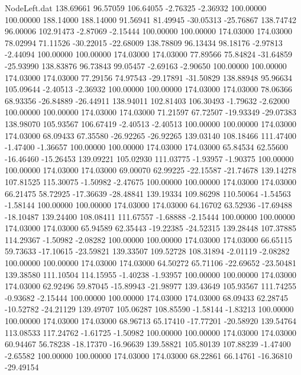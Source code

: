 \begin{filecontents}{NodeLeft.dat}
 138.69661   96.57059  106.64055    -2.76325   -2.36932  100.00000  100.00000  188.14000  188.14000   91.56941   81.49945  -30.05313  -25.76867
 138.74742   96.00006  102.91473    -2.87069   -2.15444  100.00000  100.00000  174.03000  174.03000   78.02994   71.11526  -30.22015  -22.68009
 138.78809   96.13434   98.18176    -2.97813   -2.44094  100.00000  100.00000  174.03000  174.03000   77.89566   75.84824  -31.64859  -25.93990
 138.83876   96.73843   99.05457    -2.69163   -2.90650  100.00000  100.00000  174.03000  174.03000   77.29156   74.97543  -29.17891  -31.50829
 138.88948   95.96634  105.09644    -2.40513   -2.36932  100.00000  100.00000  174.03000  174.03000   78.06366   68.93356  -26.84889  -26.44911
 138.94011  102.81403  106.30493    -1.79632   -2.62000  100.00000  100.00000  174.03000  174.03000   71.21597   67.72507  -19.93349  -29.07383
 138.98070  105.93567  106.67419    -2.40513   -2.40513  100.00000  100.00000  174.03000  174.03000   68.09433   67.35580  -26.92265  -26.92265
 139.03140  108.18466  111.47400    -1.47400   -1.36657  100.00000  100.00000  174.03000  174.03000   65.84534   62.55600  -16.46460  -15.26453
 139.09221  105.02930  111.03775    -1.93957   -1.90375  100.00000  100.00000  174.03000  174.03000   69.00070   62.99225  -22.15587  -21.74678
 139.14278  107.81525  115.30075    -1.50982   -2.47675  100.00000  100.00000  174.03000  174.03000   66.21475   58.72925  -17.36639  -28.48841
 139.19334  109.86298  110.50064    -1.54563   -1.58144  100.00000  100.00000  174.03000  174.03000   64.16702   63.52936  -17.69488  -18.10487
 139.24400  108.08411  111.67557    -1.68888   -2.15444  100.00000  100.00000  174.03000  174.03000   65.94589   62.35443  -19.22385  -24.52315
 139.28448  107.37885  114.29367    -1.50982   -2.08282  100.00000  100.00000  174.03000  174.03000   66.65115   59.73633  -17.10615  -23.59821
 139.33507  109.52728  108.31894    -2.01119   -2.08282  100.00000  100.00000  174.03000  174.03000   64.50272   65.71106  -22.69652  -23.50481
 139.38580  111.10504  114.15955    -1.40238   -1.93957  100.00000  100.00000  174.03000  174.03000   62.92496   59.87045  -15.89943  -21.98977
 139.43649  105.93567  111.74255    -0.93682   -2.15444  100.00000  100.00000  174.03000  174.03000   68.09433   62.28745  -10.52782  -24.21129
 139.49707  105.06287  108.85590    -1.58144   -1.83213  100.00000  100.00000  174.03000  174.03000   68.96713   65.17410  -17.77201  -20.58920
 139.54764  113.08533  117.24762    -1.61725   -1.50982  100.00000  100.00000  174.03000  174.03000   60.94467   56.78238  -18.17370  -16.96639
 139.58821  105.80139  107.88239    -1.47400   -2.65582  100.00000  100.00000  174.03000  174.03000   68.22861   66.14761  -16.36810  -29.49154

\end{filecontents}
